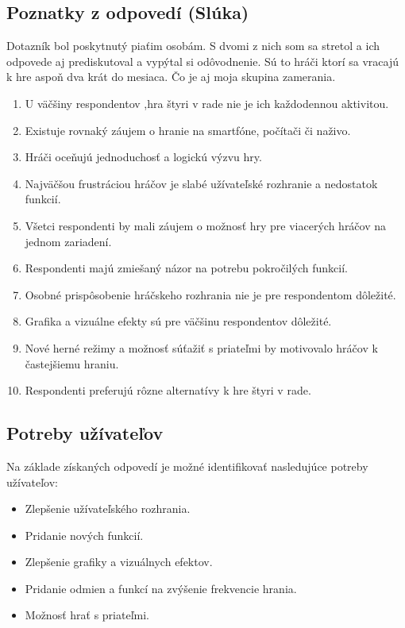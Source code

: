 \documentclass[a4paper, 11pt, onecolumn]{article}
\begin{document}
\subsection{Poznatky z odpovedí (Slúka)}
Dotazník bol poskytnutý piaťim osobám.
S dvomi z nich som sa stretol a ich odpovede aj prediskutoval a vypýtal si odôvodnenie.
Sú to hráči ktorí sa vracajú k hre aspoň dva krát do mesiaca. Čo je aj moja skupina zamerania. 
\begin{enumerate}
    \item U väčšiny respondentov ,hra štyri v rade nie je ich každodennou aktivitou.
    \item Existuje rovnaký záujem o hranie na smartfóne, počítači či naživo.
    \item Hráči oceňujú jednoduchosť a logickú výzvu hry.
    \item Najväčšou frustráciou hráčov je slabé užívateľské rozhranie a nedostatok funkcií.
    \item Všetci respondenti by mali záujem o možnosť hry pre viacerých hráčov na jednom zariadení.
    \item Respondenti majú zmiešaný názor na potrebu pokročilých funkcií.
    \item Osobné prispôsobenie hráčskeho rozhrania nie je pre respondentom dôležité.
    \item Grafika a vizuálne efekty sú pre väčšinu respondentov dôležité.
    \item Nové herné režimy a možnosť súťažiť s priateľmi by motivovalo hráčov k častejšiemu hraniu.
    \item Respondenti preferujú rôzne alternatívy k hre štyri v rade.
\end{enumerate}
\subsection*{Potreby užívateľov}
Na základe získaných odpovedí je možné identifikovať nasledujúce potreby užívateľov:
\begin{itemize}
    \item Zlepšenie užívateľského rozhrania.
    \item Pridanie nových funkcií.
    \item Zlepšenie grafiky a vizuálnych efektov.
    \item Pridanie odmien a funkcí na zvýšenie frekvencie hrania.
    \item Možnosť hrať s priateľmi.
\end{itemize}
\end{document}

